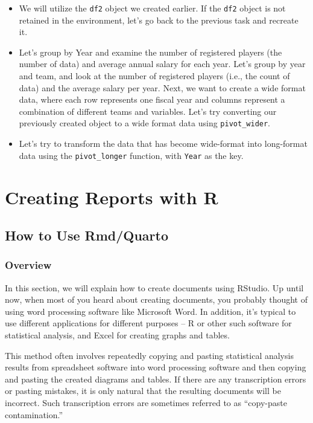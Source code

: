 \documentclass[
  a4paper,
]{book}
\providecommand{\tightlist}{%
  \setlength{\itemsep}{0pt}\setlength{\parskip}{0pt}}\usepackage{longtable,booktabs,array}
\begin{document}
\begin{itemize}
\tightlist
\item
  We will utilize the \texttt{df2} object we created earlier. If the
  \texttt{df2} object is not retained in the environment, let's go back
  to the previous task and recreate it.
\item
  Let's group by Year and examine the number of registered players (the
  number of data) and average annual salary for each year. Let's group
  by year and team, and look at the number of registered players (i.e.,
  the count of data) and the average salary per year. Next, we want to
  create a wide format data, where each row represents one fiscal year
  and columns represent a combination of different teams and variables.
  Let's try converting our previously created object to a wide format
  data using \texttt{pivot\_wider}.
\item
  Let's try to transform the data that has become wide-format into
  long-format data using the \texttt{pivot\_longer} function, with
  \texttt{Year} as the key.
\end{itemize}


\chapter{Creating Reports with R}\label{creating-reports-with-r}

\section{How to Use Rmd/Quarto}\label{how-to-use-rmdquarto}

\subsection{Overview}\label{overview}

In this section, we will explain how to create documents using RStudio.
Up until now, when most of you heard about creating documents, you
probably thought of using word processing software like Microsoft Word.
In addition, it's typical to use different applications for different
purposes -- R or other such software for statistical analysis, and Excel
for creating graphs and tables.

This method often involves repeatedly copying and pasting statistical
analysis results from spreadsheet software into word processing software
and then copying and pasting the created diagrams and tables. If there
are any transcription errors or pasting mistakes, it is only natural
that the resulting documents will be incorrect. Such transcription
errors are sometimes referred to as ``copy-paste contamination.''
\end{document}
